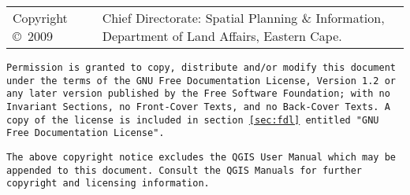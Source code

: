 
\thispagestyle{empty}



\vspace{1cm}

\begin{tabular}{lp{12cm}}
Copyright \copyright~2009 &
{\large Chief Directorate: Spatial Planning \&
 Information, Department of Land Affairs, Eastern Cape.} \\
\end{tabular}

\vspace{1.5cm}

\texttt{Permission is granted to copy, distribute and/or modify this document
under the terms of the GNU Free Documentation License, Version 1.2
or any later version published by the Free Software Foundation;
with no Invariant Sections, no Front-Cover Texts, and no Back-Cover Texts.
A copy of the license is included in section \ref{sec:fdl} entitled "GNU
Free Documentation License".}

\vspace{1.5cm}

\texttt{The above copyright notice excludes the QGIS User Manual which may be
appended to this document. Consult the QGIS Manuals for further copyright and
licensing information.}



